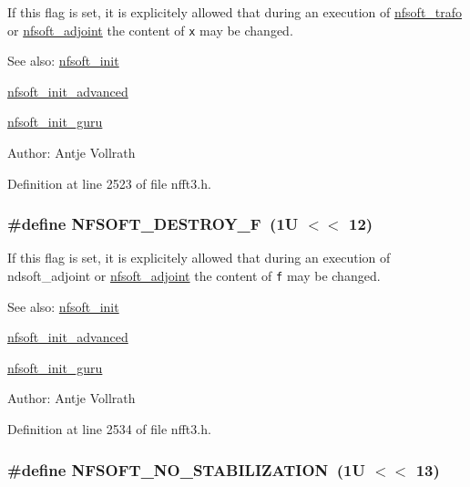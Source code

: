 If this flag is set, it is explicitely allowed that during an execution of \hyperlink{group__nfsoft_ge243cd75d7571a99eae53818e32355fb}{nfsoft\_\-trafo} or \hyperlink{group__nfsoft_g08395b1dd90f9a2565685d17460afc5b}{nfsoft\_\-adjoint} the content of {\tt x} may be changed. 

\begin{Desc}
\item[See also:]\hyperlink{group__nfsoft_g31c884458165fa204073c6c16c10775e}{nfsoft\_\-init} 

\hyperlink{group__nfsoft_gf4aec4ee2a2a5d56ca27c4f1a7f90b18}{nfsoft\_\-init\_\-advanced} 

\hyperlink{group__nfsoft_g1c13cdd3f82f48fa41acdd313cdc2052}{nfsoft\_\-init\_\-guru} \end{Desc}
\begin{Desc}
\item[Author:]Antje Vollrath \end{Desc}


Definition at line 2523 of file nfft3.h.\hypertarget{group__nfsoft_g93ab283dcb14d5b37b130e2556bb6e7d}{
\subsubsection{\setlength{\rightskip}{0pt plus 5cm}\#define NFSOFT\_\-DESTROY\_\-F~(1U $<$$<$ 12)}}
\label{group__nfsoft_g93ab283dcb14d5b37b130e2556bb6e7d}


If this flag is set, it is explicitely allowed that during an execution of ndsoft\_\-adjoint or \hyperlink{group__nfsoft_g08395b1dd90f9a2565685d17460afc5b}{nfsoft\_\-adjoint} the content of {\tt f} may be changed. 

\begin{Desc}
\item[See also:]\hyperlink{group__nfsoft_g31c884458165fa204073c6c16c10775e}{nfsoft\_\-init} 

\hyperlink{group__nfsoft_gf4aec4ee2a2a5d56ca27c4f1a7f90b18}{nfsoft\_\-init\_\-advanced} 

\hyperlink{group__nfsoft_g1c13cdd3f82f48fa41acdd313cdc2052}{nfsoft\_\-init\_\-guru} \end{Desc}
\begin{Desc}
\item[Author:]Antje Vollrath \end{Desc}


Definition at line 2534 of file nfft3.h.\hypertarget{group__nfsoft_ge6c22599d21b5d8a8f144a39b49d3677}{
\subsubsection{\setlength{\rightskip}{0pt plus 5cm}\#define NFSOFT\_\-NO\_\-STABILIZATION~(1U $<$$<$ 13)}}
\label{group__nfsoft_ge6c22599d21b5d8a8f144a39b49d3677}



